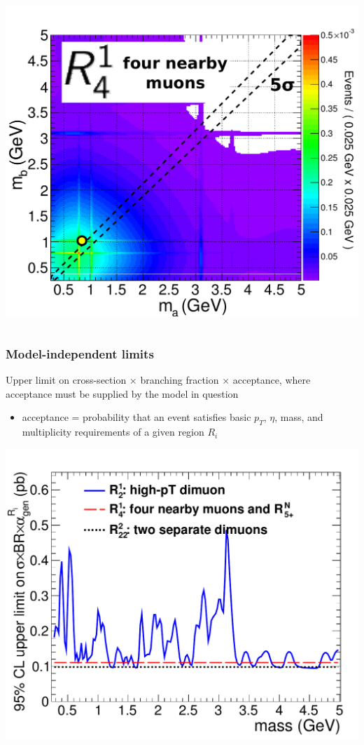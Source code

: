 \documentclass[compress]{beamer}
\begin{document}
\begin{frame}
\begin{columns}
\centering \includegraphics[width=0.9\linewidth]{a2_2dpdf.pdf}
\end{columns}
\end{frame}

\begin{frame}
\frametitle{Model-independent limits}

Upper limit on cross-section $\times$ branching fraction $\times$
acceptance, where acceptance must be supplied by the model in question
\begin{itemize}
\item acceptance = probability that an event satisfies basic $p_T$,
  $\eta$, mass, and multiplicity requirements of a given region $R_i$
\end{itemize}

\vspace{-0.7 cm}
\begin{center}
\includegraphics[width=0.65\linewidth]{ul__model_indep_sys.pdf}
\end{center}
\vspace{-0.7 cm}
\end{frame}
\end{document}
